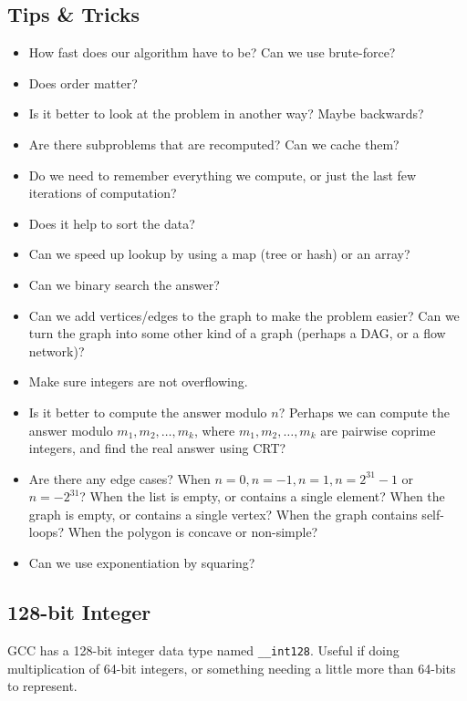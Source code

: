 \documentclass[9pt,a4paper,twocolumn,landscape,oneside]{amsart}
\begin{document}
    \subsection{Tips \&{} Tricks}
        \begin{itemize}
            \item How fast does our algorithm have to be? Can we use
                brute-force?
            \item Does order matter?
            \item Is it better to look at the problem in another way? Maybe
                backwards?
            \item Are there subproblems that are recomputed? Can we cache them?
            \item Do we need to remember everything we compute, or just the
                last few iterations of computation?
            \item Does it help to sort the data?
            \item Can we speed up lookup by using a map (tree or hash) or an
                array?
            \item Can we binary search the answer?
            \item Can we add vertices/edges to the graph to make the problem
                easier? Can we turn the graph into some other kind of a graph
                (perhaps a DAG, or a flow network)?
            \item Make sure integers are not overflowing.
            \item Is it better to compute the answer modulo $n$? Perhaps we can
                compute the answer modulo $m_1,m_2,\ldots,m_k$, where
                $m_1,m_2,\ldots,m_k$ are pairwise coprime integers, and find
                the real answer using CRT?
            \item Are there any edge cases? When $n=0, n=-1, n=1, n=2^{31}-1$
                or $n=-2^{31}$? When the list is empty, or contains a single
                element? When the graph is empty, or contains a single vertex?
                When the graph contains self-loops?  When the polygon is
                concave or non-simple?
            \item Can we use exponentiation by squaring?
        \end{itemize}

    \subsection{128-bit Integer}
        GCC has a 128-bit integer data type named \texttt{\_\_int128}. Useful
        if doing multiplication of 64-bit integers, or something needing a
        little more than 64-bits to represent.
\end{document}
